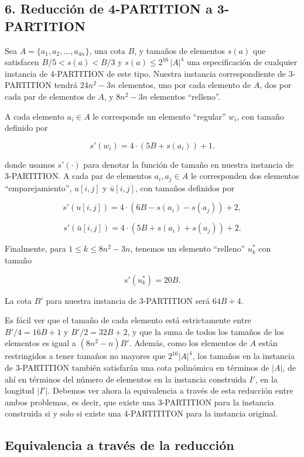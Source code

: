\documentclass{article}
\begin{document}
\subsection*{6. Reducción de 4-PARTITION a 3-PARTITION}

Sea $A=\{a_1,a_2,\ldots,a_{4n}\}$, una cota $B$, y tamaños de elementos $s(a)$ que satisfacen $B/5 < s(a) < B/3$ y $s(a) \le 2^{16}\,|A|^4$ una especificación de cualquier instancia de 4-PARTITION de este tipo. Nuestra instancia correspondiente de 3-PARTITION tendrá $24n^2-3n$ elementos, uno por cada elemento de $A$, dos por cada par de elementos de $A$, y $8n^2-3n$ elementos ``relleno''.

A cada elemento $a_i \in A$ le corresponde un elemento ``regular'' $w_i$, con tamaño definido por

\[
s'(w_i)=4\cdot(5B+s(a_i))+1.
\]

donde usamos $s'(\cdot)$ para denotar la función de tamaño en nuestra instancia de 3-PARTITION. A cada par de elementos $a_i,a_j\in A$ le corresponden dos elementos ``emparejamiento'', $u[i,j]$ y $\bar{u}[i,j]$, con tamaños definidos por

\[
s'(u[i,j])=4\cdot(6B-s(a_i)-s(a_j))+2,
\]

\[
s'(\bar{u}[i,j])=4\cdot(5B+s(a_i)+s(a_j))+2.
\]

Finalmente, para $1 \le k \le 8n^2-3n$, tenemos un elemento ``relleno'' $u_k^*$ con tamaño

\[
s'(u_k^*)=20B.
\]

La cota $B'$ para nuestra instancia de 3-PARTITION será $64B+4$.

Es fácil ver que el tamaño de cada elemento está estrictamente entre $B'/4=16B+1$ y $B'/2=32B+2$, y que la suma de todos los tamaños de los elementos es igual a $(8n^2-n)B'$. Además, como los elementos de $A$ están restringidos a tener tamaños no mayores que $2^{16}|A|^4$, los tamaños en la instancia de 3-PARTITION también satisfarán una cota polinómica en términos de $|A|$, de ahí en términos del número de elementos en la instancia construida $I'$, en la longitud $|I'|$. Debemos ver ahora la equivalencia a través de esta reducción entre ambos problemas, es decir, que existe una 3-PARTITION para la instancia construida si y solo si existe una 4-PARTITITON para la instancia original.


\subsection*{Equivalencia a través de la reducción}
\end{document}
